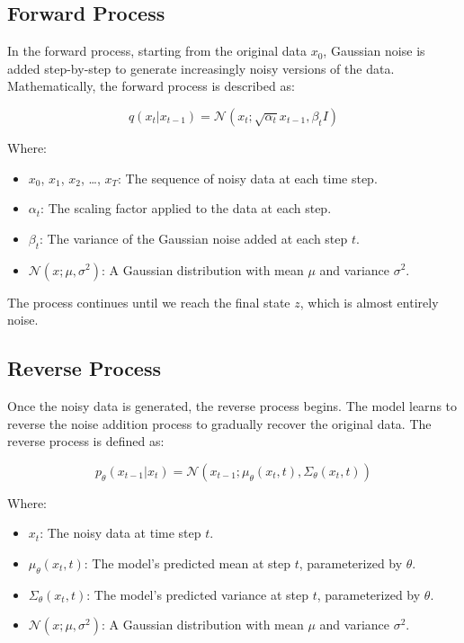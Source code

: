 \subsection{Forward Process}
In the forward process, starting from the original data \(x_0\), Gaussian noise is added step-by-step to generate increasingly noisy versions of the data. Mathematically, the forward process is described as:

\begin{equation}
q(x_t | x_{t-1}) = \mathcal{N}(x_t; \sqrt{\alpha_t} x_{t-1}, \beta_t I)
\end{equation}

Where:
\begin{itemize}
    \item \(x_0\), \(x_1\), \(x_2\), \dots, \(x_T\): The sequence of noisy data at each time step.
    \item \(\alpha_t\): The scaling factor applied to the data at each step.
    \item \(\beta_t\): The variance of the Gaussian noise added at each step \(t\).
    \item \(\mathcal{N}(x; \mu, \sigma^2)\): A Gaussian distribution with mean \(\mu\) and variance \(\sigma^2\).
\end{itemize}

The process continues until we reach the final state \(z\), which is almost entirely noise.

\subsection{Reverse Process}
Once the noisy data is generated, the reverse process begins. The model learns to reverse the noise addition process to gradually recover the original data. The reverse process is defined as:

\begin{equation}
p_\theta(x_{t-1} | x_t) = \mathcal{N}(x_{t-1}; \mu_\theta(x_t, t), \Sigma_\theta(x_t, t))
\end{equation}

Where:
\begin{itemize}
    \item \(x_t\): The noisy data at time step \(t\).
    \item \(\mu_\theta(x_t, t)\): The model's predicted mean at step \(t\), parameterized by \(\theta\).
    \item \(\Sigma_\theta(x_t, t)\): The model's predicted variance at step \(t\), parameterized by \(\theta\).
    \item \(\mathcal{N}(x; \mu, \sigma^2)\): A Gaussian distribution with mean \(\mu\) and variance \(\sigma^2\).
\end{itemize}

